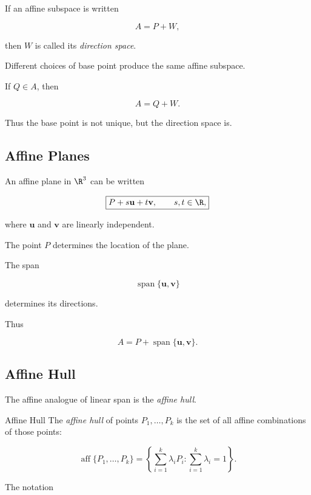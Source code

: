 If an affine subspace is written

\[ A=P+W, \]

then \(W\) is called its \emph{direction space}.

Different choices of base point produce the same affine subspace.

If \(Q\in A\), then

\[ A=Q+W. \]

Thus the base point is not unique, but the direction space is.

\subsection{Affine Planes}
\label{subsec:affine-planes}

An affine plane in \(\R^3\) can be written

\[
\boxed{
P+s\mathbf{u}+t\mathbf{v},
\qquad s,t\in\R,
}
\]

where \(\mathbf{u}\) and \(\mathbf{v}\) are linearly independent.

The point \(P\) determines the location of the plane.

The span

\[ \operatorname{span}\{\mathbf{u},\mathbf{v}\} \]

determines its directions.

Thus

\[
A=P+\operatorname{span}\{\mathbf{u},\mathbf{v}\}.
\]

\subsection{Affine Hull}
\label{subsec:affine-hull}

The affine analogue of linear span is the \emph{affine hull}.

\begin{definitionbox}{Affine Hull}
The \emph{affine hull} of points \(P_1,\ldots,P_k\) is the set of all affine
combinations of those points:

\[
\boxed{
\operatorname{aff}\{P_1,\ldots,P_k\}
=
\left\{
\sum_{i=1}^{k}\lambda_iP_i:
\sum_{i=1}^{k}\lambda_i=1
\right\}.
}
\]
\end{definitionbox}

The notation

